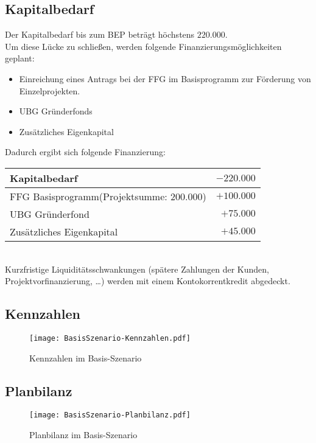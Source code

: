 \subsection{Kapitalbedarf}
Der Kapitalbedarf bis zum BEP beträgt höchstens $220.000$\officialeuro.\\
Um diese Lücke zu schließen, werden folgende Finanzierungsmöglichkeiten geplant:
\begin{itemize}
	\item Einreichung eines Antrags bei der FFG im Basisprogramm zur Förderung von Einzelprojekten.
	\item UBG Gründerfonds
	\item Zusätzliches Eigenkapital
\end{itemize}
Dadurch ergibt sich folgende Finanzierung:\\
\begin{tabular}{l r}
	Kapitalbedarf & $-220.000$\officialeuro \\
	\hline
	FFG Basisprogramm(Projektsumme: $200.000$\officialeuro) & $+100.000$\officialeuro \\
	UBG Gründerfond & $+75.000$\officialeuro \\
	Zusätzliches Eigenkapital & $+45.000$\officialeuro \\
	\bottomrule
\end{tabular}\\

\noindent Kurzfristige Liquiditätsschwankungen (spätere Zahlungen der Kunden, Projektvorfinanzierung, …) werden mit einem Kontokorrentkredit abgedeckt.

\subsection{Kennzahlen}
\begin{figure}[h]
	\centering
	\texttt{[image: BasisSzenario-Kennzahlen.pdf]}
	\caption{Kennzahlen im Basis-Szenario}
	\label{fig:BasisSzenario-Kennzahlen}
\end{figure}
\newpage
\subsection{Planbilanz}
\begin{figure}[h]
	\centering
	\texttt{[image: BasisSzenario-Planbilanz.pdf]}
	\caption{Planbilanz im Basis-Szenario}
	\label{fig:BasisSzenario-Planbilanz}
\end{figure}

\newpage
